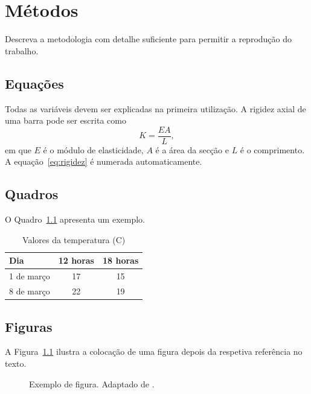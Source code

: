\chapter{Métodos}
Descreva a metodologia com detalhe suficiente para permitir a reprodução do trabalho.

\section{Equações}
Todas as variáveis devem ser explicadas na primeira utilização. A rigidez axial de uma barra pode ser escrita como
\begin{equation}
  K = \frac{EA}{L},
  \label{eq:rigidez}
\end{equation}
em que $E$ é o módulo de elasticidade, $A$ é a área da secção e $L$ é o comprimento. A equação~\eqref{eq:rigidez} é numerada automaticamente.

\section{Quadros}
O Quadro~\ref{tab:temperaturas} apresenta um exemplo.
\begin{table}[htbp]
  \centering
  \caption{Valores da temperatura (\textdegree C)}
  \label{tab:temperaturas}
  \begin{tabular}{lcc}
    \toprule
    Dia & 12 horas & 18 horas\\
    \midrule
    1 de março & 17 & 15\\
    8 de março & 22 & 19\\
    \bottomrule
  \end{tabular}
\end{table}

\section{Figuras}
A Figura~\ref{fig:exemplo} ilustra a colocação de uma figura depois da respetiva referência no texto.
\begin{figure}[htbp]
  \centering
  \fbox{\rule{0pt}{4cm}\rule{0.75\textwidth}{0pt}}
  \caption{Exemplo de figura. Adaptado de \textcite{neville2011}.}
  \label{fig:exemplo}
\end{figure}
